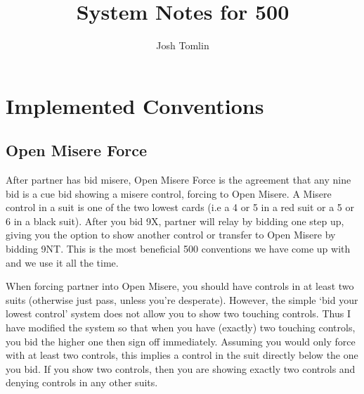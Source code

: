 \documentclass[a4paper]{JoshCards}
\title{System Notes for 500}
\author{Josh Tomlin}
\date{}
\begin{document}
\maketitle

\chapter*{Implemented Conventions}

\section*{Open Misere Force}

After partner has bid misere, Open Misere Force is the agreement that any nine bid is a cue bid showing a misere control, forcing to Open Misere. A Misere control in a suit is one of the two lowest cards (i.e a 4 or 5 in a red suit or a 5 or 6 in a black suit). After you bid 9X, partner will relay by bidding one step up, giving you the option to show another control or transfer to Open Misere by bidding 9NT. This is the most beneficial 500 conventions we have come up with and we use it all the time.

When forcing partner into Open Misere, you should have controls in at least two suits (otherwise just pass, unless you're desperate). However, the simple `bid your lowest control' system does not allow you to show two touching controls. Thus I have modified the system so that when you have (exactly) two touching controls, you bid the higher one then sign off immediately. Assuming you would only force with at least two controls, this implies a control in the suit directly below the one you bid. If you show two controls, then you are showing exactly two controls and denying controls in any other suits.
\end{document}
